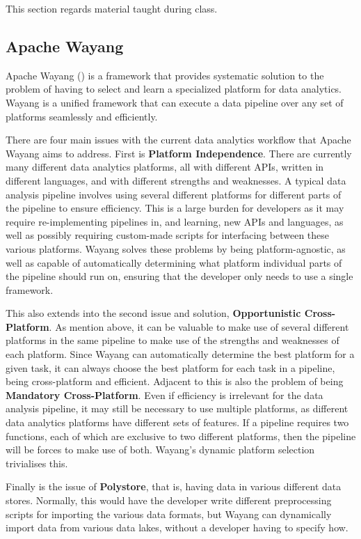 This section regards material taught during class.

\subsection{Apache Wayang}

Apache Wayang (\cite{58d56a9c6f264d75800463fbb4117538}) is a framework that provides systematic solution to the problem of having to select and learn a specialized platform for data analytics. Wayang is a unified framework that can execute a data pipeline over any set of platforms seamlessly and efficiently.

There are four main issues with the current data analytics workflow that Apache Wayang aims to address. First is \textbf{Platform Independence}. There are currently many different data analytics platforms, all with different APIs, written in different languages, and with different strengths and weaknesses. A typical data analysis pipeline involves using several different platforms for different parts of the pipeline to ensure efficiency. This is a large burden for developers as it may require re-implementing pipelines in, and learning, new APIs and languages, as well as possibly requiring custom-made scripts for interfacing between these various platforms. Wayang solves these problems by being platform-agnostic, as well as capable of automatically determining what platform individual parts of the pipeline should run on, ensuring that the developer only needs to use a single framework.

This also extends into the second issue and solution, \textbf{Opportunistic Cross-Platform}. As mention above, it can be valuable to make use of several different platforms in the same pipeline to make use of the strengths and weaknesses of each platform. Since Wayang can automatically determine the best platform for a given task, it can always choose the best platform for each task in a pipeline, being cross-platform and efficient. Adjacent to this is also the problem of being \textbf{Mandatory Cross-Platform}. Even if efficiency is irrelevant for the data analysis pipeline, it may still be necessary to use multiple platforms, as different data analytics platforms have different sets of features. If a pipeline requires two functions, each of which are exclusive to two different platforms, then the pipeline will be forces to make use of both. Wayang's dynamic platform selection trivialises this.

Finally is the issue of \textbf{Polystore}, that is, having data in various different data stores. Normally, this would have the developer write different preprocessing scripts for importing the various data formats, but Wayang can dynamically import data from various data lakes, without a developer having to specify how.

